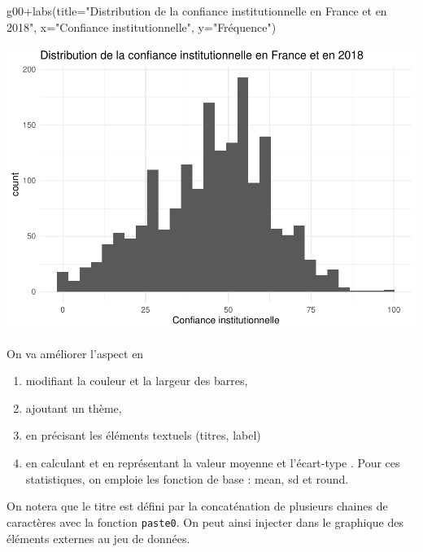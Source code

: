 \documentclass[
]{book}
\newenvironment{Shaded}{\begin{snugshade}}{\end{snugshade}}
\newcommand{\AttributeTok}[1]{\textcolor[rgb]{0.77,0.63,0.00}{#1}}
\newcommand{\FunctionTok}[1]{\textcolor[rgb]{0.00,0.00,0.00}{#1}}
\newcommand{\NormalTok}[1]{#1}
\newcommand{\SpecialCharTok}[1]{\textcolor[rgb]{0.00,0.00,0.00}{#1}}
\newcommand{\StringTok}[1]{\textcolor[rgb]{0.31,0.60,0.02}{#1}}
\providecommand{\tightlist}{%
  \setlength{\itemsep}{0pt}\setlength{\parskip}{0pt}}
\begin{document}
\begin{Shaded}
\begin{Highlighting}[]
\NormalTok{g00}\SpecialCharTok{+}\FunctionTok{labs}\NormalTok{(}\AttributeTok{title=}\StringTok{"Distribution de la confiance institutionnelle en France et en 2018"}\NormalTok{,}
         \AttributeTok{x=}\StringTok{"Confiance institutionnelle"}\NormalTok{, }\AttributeTok{y=}\StringTok{"Fréquence"}\NormalTok{)}
\end{Highlighting}
\end{Shaded}

\includegraphics{bookdown-demo_files/figure-latex/302-2.pdf}

On va améliorer l'aspect en

\begin{enumerate}
\def\labelenumi{\arabic{enumi}.}
\tightlist
\item
  modifiant la couleur et la largeur des barres,
\item
  ajoutant un thème,
\item
  en précisant les éléments textuels (titres, label)
\item
  en calculant et en représentant la valeur moyenne et l'écart-type . Pour ces statistiques, on emploie les fonction de base : mean, sd et round.
\end{enumerate}

On notera que le titre est défini par la concaténation de plusieurs chaines de caractères avec la fonction \texttt{paste0}. On peut ainsi injecter dans le graphique des éléments externes au jeu de données.
\end{document}
